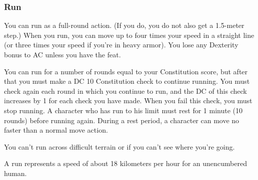 \subsubsection{Run}
You can run as a full-round action. (If you do, you do not also get a 1.5-meter step.) When you run, you can move up to four times your speed in a straight line (or three times your speed if you're in heavy armor). You lose any Dexterity bonus to AC unless you have the  feat.

You can run for a number of rounds equal to your Constitution score, but after that you must make a DC 10 Constitution check to continue running. You must check again each round in which you continue to run, and the DC of this check increases by 1 for each check you have made. When you fail this check, you must stop running. A character who has run to his limit must rest for 1 minute (10 rounds) before running again. During a rest period, a character can move no faster than a normal move action.

You can't run across difficult terrain or if you can't see where you're going.

A run represents a speed of about 18 kilometers per hour for an unencumbered human.